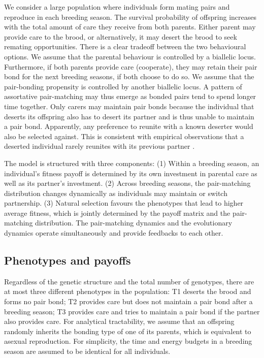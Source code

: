 \documentclass[12pt]{article}
\begin{document}
We consider a large population where individuals form mating pairs and reproduce in each breeding season. The survival probability of offspring increases with the total amount of care they receive from both parents. Either parent may provide care to the brood, or alternatively, it may desert the brood to seek remating opportunities. There is a clear tradeoff between the two behavioural options. We assume that the parental behaviour is controlled by a biallelic locus. Furthermore, if both parents provide care (cooperate), they may retain their pair bond for the next breeding seasons, if both choose to do so. We assume that the pair-bonding propensity is controlled by another biallelic locus. A pattern of assortative pair-matching may thus emerge as bonded pairs tend to spend longer time together. Only carers may maintain pair bonds because the individual that deserts its offspring also has to desert its partner and is thus unable to maintain a pair bond. Apparently, any preference to reunite with a known deserter would also be selected against. This is consistent with empirical observations that a deserted individual rarely reunites with its previous partner \citep{Ens1996}.

The model is structured with three components: (1) Within a breeding season, an individual's fitness payoff is determined by its own investment in parental care as well as its partner's investment. (2) Across breeding seasons, the pair-matching distribution changes dynamically as individuals may maintain or switch partnership. (3) Natural selection favours the phenotypes that lead to higher average fitness, which is jointly determined by the payoff matrix and the pair-matching distribution. The pair-matching dynamics and the evolutionary dynamics operate simultaneously and provide feedbacks to each other.

\subsection*{Phenotypes and payoffs}

Regardless of the genetic structure and the total number of genotypes, there are at most three different phenotypes in the population: T1 deserts the brood and forms no pair bond; T2 provides care but does not maintain a pair bond after a breeding season; T3 provides care and tries to maintain a pair bond if the partner also provides care. For analytical tractability, we assume that an offspring randomly inherits the bonding type of one of its parents, which is equivalent to asexual reproduction. For simplicity, the time and energy budgets in a breeding season are assumed to be identical for all individuals.
\end{document}
